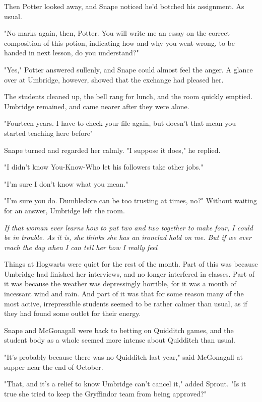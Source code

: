 Then Potter looked away, and Snape noticed he'd botched his assignment. As usual.

"No marks again, then, Potter. You will write me an essay on the correct composition of this potion, indicating how and why you went wrong, to be handed in next lesson, do you understand?"

"Yes," Potter answered sullenly, and Snape could almost feel the anger. A glance over at Umbridge, however, showed that the exchange had pleased her.

The students cleaned up, the bell rang for lunch, and the room quickly emptied. Umbridge remained, and came nearer after they were alone.

"Fourteen years. I have to check your file again, but doesn't that mean you started teaching here before{\el}"

Snape turned and regarded her calmly. "I suppose it does," he replied.

"I didn't know You-Know-Who let his followers take other jobs."

"I'm sure I don't know what you mean."

"I'm sure you do. Dumbledore can be too trusting at times, no?" Without waiting for an answer, Umbridge left the room.

\emph{If that woman ever learns how to put two and two together to make four, I could be in trouble. As it is, she thinks she has an ironclad hold on me. But if we ever reach the day when I can tell her how I really feel{\el}}

Things at Hogwarts were quiet for the rest of the month. Part of this was because Umbridge had finished her interviews, and no longer interfered in classes. Part of it was because the weather was depressingly horrible, for it was a month of incessant wind and rain. And part of it was that for some reason many of the most active, irrepressible students seemed to be rather calmer than usual, as if they had found some outlet for their energy.

Snape and McGonagall were back to betting on Quidditch games, and the student body as a whole seemed more intense about Quidditch than usual.

"It's probably because there was no Quidditch last year," said McGonagall at supper near the end of October.

"That, and it's a relief to know Umbridge can't cancel it," added Sprout. "Is it true she tried to keep the Gryffindor team from being approved?"

